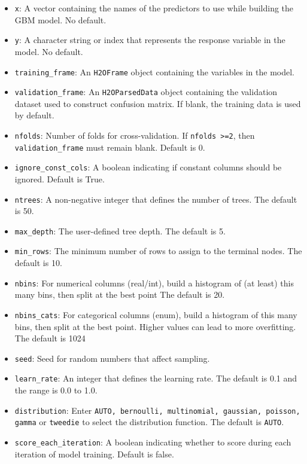 \begin{itemize}
\item {\texttt{x}}: A vector containing the names of the predictors to use while building the GBM model. No default.
\item {\texttt{y}}: A character string or index that represents the response variable in the model. No default.
\item {\texttt{training\_frame}}: An \texttt{H2OFrame} object containing the variables in the model. 
\item {\texttt{validation\_frame}}: An \texttt{H2OParsedData} object containing the validation dataset used to construct confusion matrix. If  blank, the training data is used by default.
\item {\texttt{nfolds}}: Number of folds for cross-validation. If \texttt{nfolds >=2}, then \texttt{validation\_frame} must remain blank. Default is 0. %
\item {\texttt{ignore\_const\_cols}}: A boolean indicating if constant columns should be ignored.  Default is True.
\item {\texttt{ntrees}}: A non-negative integer that defines the number of trees. The default is 50.
\item {\texttt{max\_depth}}: The user-defined tree depth. The default is 5.
\item {\texttt{min\_rows}}: The minimum number of rows to assign to the terminal nodes. The default is 10.
\item {\texttt{nbins}}: For numerical columns (real/int), build a histogram of (at least) this many bins, then split at the best point The default is 20.
\item {\texttt{nbins\_cats}}: For categorical columns (enum), build a histogram of this many bins, then split at the best point. Higher values can lead to more overfitting.  The default is 1024
\item {\texttt{seed}}: Seed for random numbers that affect sampling.
\item {\texttt{learn\_rate}}: An integer that defines the learning rate. The default is 0.1 and the range is 0.0 to 1.0.
\item {\texttt{distribution}}: Enter {\texttt{AUTO, bernoulli, multinomial, gaussian, poisson, gamma}} or {\texttt{tweedie}} to select the distribution function. The default is {\texttt{AUTO}}.
\item {\texttt{score\_each\_iteration}}: A boolean indicating whether to score during each iteration of model training.  Default is false.

\end{itemize}
